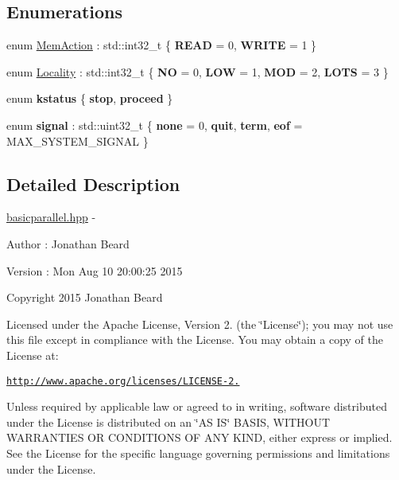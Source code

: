 \subsection*{Enumerations}
\begin{DoxyCompactItemize}
\item 
enum \hyperlink{namespaceraft_aa5b30239b85dd904f012b8982a9436b9}{Mem\+Action} \+: std\+::int32\+\_\+t \{ {\bfseries R\+E\+AD} = 0, 
{\bfseries W\+R\+I\+TE} = 1
 \}
\item 
enum \hyperlink{namespaceraft_ae150b57b2cf963cc45ea81e0c504a46c}{Locality} \+: std\+::int32\+\_\+t \{ {\bfseries NO} = 0, 
{\bfseries L\+OW} = 1, 
{\bfseries M\+OD} = 2, 
{\bfseries L\+O\+TS} = 3
 \}
\item 
\hypertarget{namespaceraft_a0d60fc92faf93d85edd021f6b32b9a38}{}\label{namespaceraft_a0d60fc92faf93d85edd021f6b32b9a38} 
enum {\bfseries kstatus} \{ {\bfseries stop}, 
{\bfseries proceed}
 \}
\item 
\hypertarget{namespaceraft_ad471cb5d2da1a6b7e321456abebe8036}{}\label{namespaceraft_ad471cb5d2da1a6b7e321456abebe8036} 
enum {\bfseries signal} \+: std\+::uint32\+\_\+t \{ {\bfseries none} = 0, 
{\bfseries quit}, 
{\bfseries term}, 
{\bfseries eof} = M\+A\+X\+\_\+\+S\+Y\+S\+T\+E\+M\+\_\+\+S\+I\+G\+N\+AL
 \}
\end{DoxyCompactItemize}


\subsection{Detailed Description}
\hyperlink{basicparallel_8hpp_source}{basicparallel.\+hpp} -\/ \begin{DoxyAuthor}{Author}
\+: Jonathan Beard 
\end{DoxyAuthor}
\begin{DoxyVersion}{Version}
\+: Mon Aug 10 20\+:00\+:25 2015
\end{DoxyVersion}
Copyright 2015 Jonathan Beard

Licensed under the Apache License, Version 2. (the \char`\"{}\+License\char`\"{}); you may not use this file except in compliance with the License. You may obtain a copy of the License at\+:

\href{http://www.apache.org/licenses/LICENSE-2.0}{\tt http\+://www.\+apache.\+org/licenses/\+L\+I\+C\+E\+N\+S\+E-\/2.}

Unless required by applicable law or agreed to in writing, software distributed under the License is distributed on an \char`\"{}\+A\+S I\+S\char`\"{} B\+A\+S\+IS, W\+I\+T\+H\+O\+UT W\+A\+R\+R\+A\+N\+T\+I\+ES OR C\+O\+N\+D\+I\+T\+I\+O\+NS OF A\+NY K\+I\+ND, either express or implied. See the License for the specific language governing permissions and limitations under the License.

